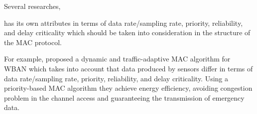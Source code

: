 \documentclass[sigchi]{acmart}
\begin{document}
Several researches, 



has its own  attributes in terms of data rate/sampling rate, priority, reliability, and delay criticality which should be taken into consideration in the structure of the MAC protocol.

For example, \citet{ImprovedMAC} proposed a dynamic and traffic-adaptive MAC algorithm for WBAN which takes into account that data produced by sensors differ in terms of data rate/sampling rate, priority, reliability, and delay criticality. Using a priority-based MAC algorithm they achieve energy efficiency, avoiding congestion problem in the 
channel access and guaranteeing the transmission of emergency data. 



















\appendix
\end{document}
